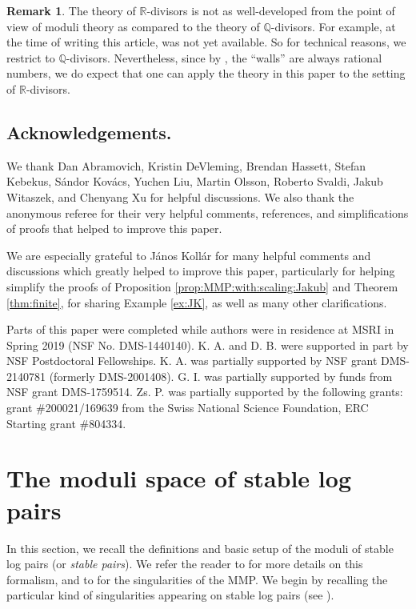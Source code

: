 \documentclass[11pt]{amsart}
\theoremstyle{definition}
\newtheorem{remark}[theorem]{Remark}
\theoremstyle{remark}
\begin{document}
	\begin{remark}
		The theory of $\mathbb{R}$-divisors is not as well-developed from the point of view of moduli theory as compared to the theory of $\mathbb{Q}$-divisors. For example, at the time of writing this article, \cite[Section 11.4]{kollarmodulibook} was not yet available. So for technical reasons, we restrict to $\mathbb{Q}$-divisors. Nevertheless, since by \cite[Corollary 1.1.5]{BCHM10}, the ``walls'' are always rational numbers, we do expect that one can apply the theory in this paper to the setting of $\mathbb{R}$-divisors.
	\end{remark}
	
	\subsection*{Acknowledgements.} We thank Dan Abramovich, Kristin DeVleming, Brendan Hassett, Stefan Kebekus, S\'andor Kov\'acs, Yuchen Liu, Martin Olsson, Roberto Svaldi, Jakub Witaszek, and Chenyang Xu for helpful discussions. We also thank the anonymous referee for their very helpful comments, references, and simplifications of proofs that helped to improve this paper.
	
	
	We are especially grateful to J\'anos Koll\'ar for many helpful comments and discussions which greatly helped to improve this paper, particularly for helping simplify the proofs of Proposition \ref{prop:MMP:with:scaling:Jakub} and Theorem \ref{thm:finite}, for sharing Example \ref{ex:JK}, as well as many other clarifications. 
	
	
	Parts of this paper were completed while authors were in residence at MSRI in Spring
	2019 (NSF No.
	DMS-1440140). K. A. and D. B. were supported in part by NSF Postdoctoral Fellowships. K. A. was partially supported by NSF grant DMS-2140781 (formerly DMS-2001408). G. I. was partially supported by funds from NSF grant DMS-1759514. Zs. P. was partially supported by the following grants: grant \#200021/169639 from the Swiss National Science Foundation,  ERC Starting grant \#804334.
	
	
	
	
	\section{The moduli space of stable log pairs} \label{section:moduli:of:stable:pairs}
	
	In this section, we recall the definitions and basic setup of the moduli of stable log pairs (or \emph{stable pairs}). We refer the reader to \cite{kollarmodulibook, Kollarsingmmp} for more details on this formalism, and to \cite[Section 2.3]{KM98} for the singularities of the MMP. We begin by recalling the particular kind of singularities appearing on stable log pairs (see \cite[Chapter 5]{Kollarsingmmp}). 
	
\end{document}
